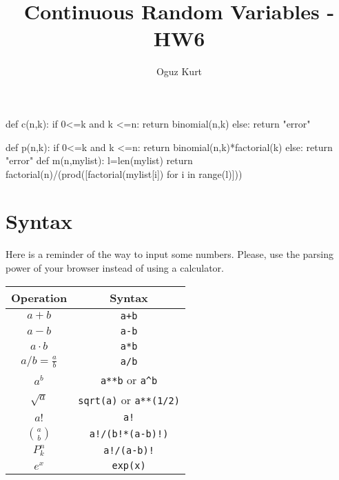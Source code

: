 \documentclass{ximera}
\title{Continuous Random Variables - HW6}
\author{Oguz Kurt}
\begin{document}
\begin{abstract}
\empty
\end{abstract}
\maketitle
\begin{sagesilent}
def c(n,k):
    if 0<=k and k <=n:
        return binomial(n,k)
    else:
        return "error"

def p(n,k):
    if 0<=k and k <=n:
        return binomial(n,k)*factorial(k)
    else:
        return "error"
def m(n,mylist):
    l=len(mylist)
    return factorial(n)/(prod([factorial(mylist[i]) for i in range(l)]))
\end{sagesilent}



\section*{Syntax}
Here is a reminder of the way to input some numbers. Please, use the parsing power of your browser instead of using a calculator.

\hspace{0.5cm}


\begin{tabular}{c|c}
Operation & Syntax  
\\
\hline
$a+b$ & {\color{red} \verb!a+b!} 
\\
\hline
$a- b$ & {\color{red} \verb!a-b!} 
\\
\hline
$a\cdot b$ & {\color{red} \verb!a*b! } 
\\
\hline
$a/b=\frac{a}{b}$ & {\color{red} \verb!a/b!}
\\
\hline
$a^b$ & {\color{red} \verb|a**b| or \verb|a^b|} 
\\
\hline
$\sqrt{a}$ & {\color{red} \verb|sqrt(a)| or \verb|a**(1/2)|} 
\\
\hline
$a!$ & {\color{red} \verb|a!|} 
\\
\hline
$\binom{a}{b}$ & {\color{red} \verb|a!/(b!*(a-b)!)|}
\\
\hline
$P_k^n$ & {\color{red} \verb|a!/(a-b)!|}
\\
\hline
$e^x$ & {\color{red} \verb|exp(x)|}
\\
\end{tabular}

\hspace{1cm}
\end{document}
